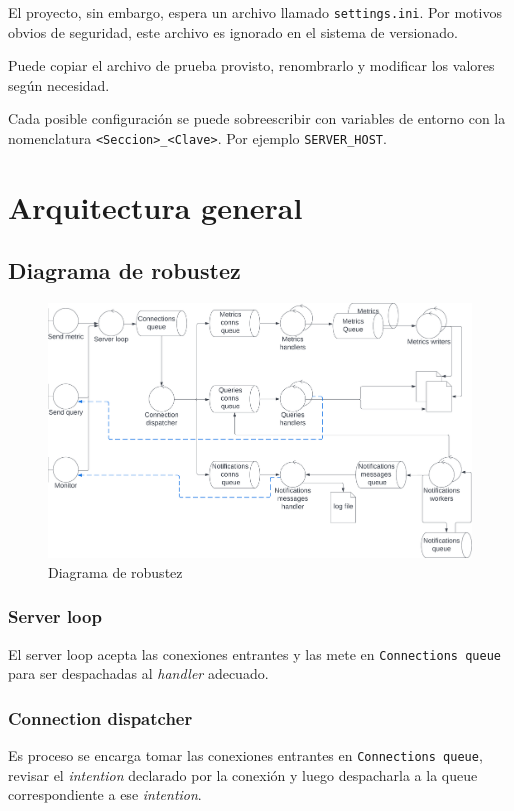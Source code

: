 \documentclass[titlepage,a4paper,oneside]{article}
\begin{document}
El proyecto, sin embargo, espera un archivo llamado \texttt{settings.ini}. Por motivos obvios de seguridad, este archivo es ignorado en el sistema de versionado.

Puede copiar el archivo de prueba provisto, renombrarlo y modificar los valores según necesidad.

Cada posible configuración se puede sobreescribir con variables de entorno con la nomenclatura \texttt{<Seccion>\_<Clave>}. Por ejemplo \texttt{SERVER\_HOST}.

\section{Arquitectura general}
\subsection{Diagrama de robustez} \label{robustez}
\begin{figure}[H]
\centering
\includegraphics[width=\textwidth]{images/diagrama_robustez.png}
\caption{Diagrama de robustez}
\end{figure}

\subsubsection{Server loop}
El server loop acepta las conexiones entrantes y las mete en \texttt{Connections queue} para ser despachadas al \textit{handler} adecuado.

\subsubsection{Connection dispatcher}
Es proceso se encarga tomar las conexiones entrantes en \texttt{Connections queue}, revisar el \textit{intention} declarado por la conexión y luego despacharla a la queue correspondiente a ese \textit{intention}.
\end{document}
